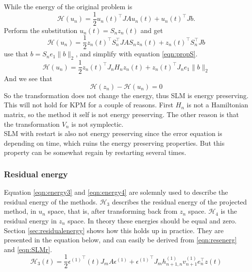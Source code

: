 While the energy of the original problem is 
\begin{equation*}
\mathcal{H}(u_n) = \frac{1}{2}u_n(t)^\top J A u_n(t) + u_n(t)^\top J b.
\end{equation*}
Perform the substitution $ u_n(t) = S_n z_n(t) $ and get
\begin{equation*}
\mathcal{H}(u_n) = \frac{1}{2}z_n(t)^\top S_n^\top J A S_n z_n(t) + z_n(t)^\top S_n^\top J b
\end{equation*}
use that $ b = S_n e_1 \| b \|_2 $, and simplify with equation \eqref{eqn:propS}.
\begin{equation*}
\mathcal{H}(u_n) = \frac{1}{2}z_n(t)^\top J_n H_n z_n(t) + z_n(t)^\top J_n e_1 \|b \|_2
\end{equation*}
And we see that 
\begin{equation*}
\mathcal{H}(z_n) - \mathcal{H}(u_n) = 0
\end{equation*}
So the transformation does not change the energy, thus SLM is energy preserving. This will not hold for KPM for a couple of reasons. First $H_n$ is not a Hamiltonian matrix, so the method it self is not energy preserving. The other reason is that the transformation $V_n$ is not symplectic.\\ 
SLM with restart is also not energy preserving since the error equation is depending on time, which ruins the energy preserving properties. But this property can be somewhat regain by restarting several times.
\subsubsection{Residual energy}
Equation \eqref{eqn:energy3} and \eqref{eqn:energy4} are solemnly used to describe the residual energy of the methods. $\mathcal{H}_3$ describes the residual energy of the projected method, in $u_n$ space, that is, after transforming back from $z_n$ space. $\mathcal{H}_4$ is the residual energy in $z_n$ space. In theory these energies should be equal and zero. Section \ref{sec:residualenergy} shows how this holds up in practice. 
They are presented in the equation below, and can easily be derived from \eqref{eqn:resenerg} and \eqref{eqn:SLMr}. \\
\begin{equation}
\mathcal{H}_3 (t) = \frac{1}{2} {\epsilon^{(1)}}^\top (t) J_m A \epsilon^{(1)} + {\epsilon^{(1)}}^\top J_m h_{n+1,n}^{(1)} v_{n+1}^{(1)} e_n^\top z(t)
\label{eqn:energy3}
\end{equation}

